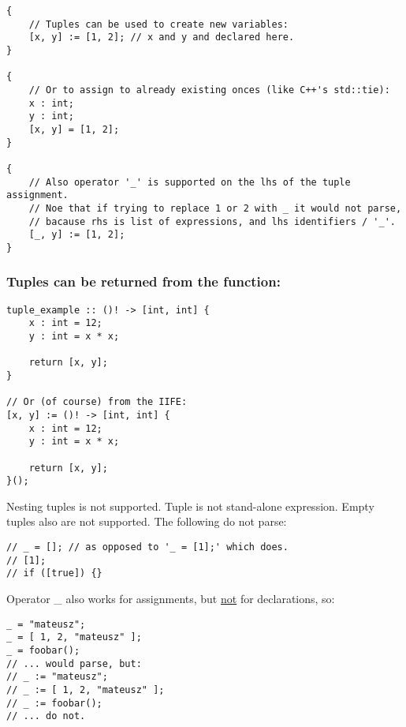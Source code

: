 \documentclass[11pt]{article}
\begin{document}
\begin{verbatim}
{
    // Tuples can be used to create new variables:
    [x, y] := [1, 2]; // x and y and declared here.
}

{
    // Or to assign to already existing onces (like C++'s std::tie):
    x : int;
    y : int;
    [x, y] = [1, 2];
}

{
    // Also operator '_' is supported on the lhs of the tuple assignment.
    // Noe that if trying to replace 1 or 2 with _ it would not parse,
    // bacause rhs is list of expressions, and lhs identifiers / '_'.
    [_, y] := [1, 2];
}
\end{verbatim}

\subsubsection*{Tuples can be returned from the function:}
\label{sec:orgc702e08}
\begin{verbatim}
tuple_example :: ()! -> [int, int] {
    x : int = 12;
    y : int = x * x;

    return [x, y];
}

// Or (of course) from the IIFE:
[x, y] := ()! -> [int, int] {
    x : int = 12;
    y : int = x * x;

    return [x, y];
}();
\end{verbatim}

Nesting tuples is not supported. Tuple is not stand-alone expression. Empty
tuples also are not supported. The following do not parse:
\begin{verbatim}
// _ = []; // as opposed to '_ = [1];' which does.
// [1];
// if ([true]) {}
\end{verbatim}

Operator \_ also works for assignments, but \uline{not} for declarations, so:
\begin{verbatim}
_ = "mateusz";
_ = [ 1, 2, "mateusz" ];
_ = foobar();
// ... would parse, but:
// _ := "mateusz";
// _ := [ 1, 2, "mateusz" ];
// _ := foobar();
// ... do not.
\end{verbatim}
\end{document}
